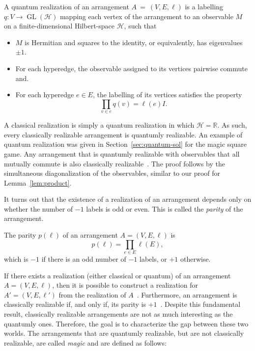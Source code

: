 \documentclass{llncs}
\begin{document}
\begin{definition}\label{def:quantum-re}
  A quantum realization of an arrangement \(A~=~(V, E, \ell)\) is a
  labelling \(q\colon V \to \operatorname{GL}(\mathcal{H})\) mapping
  each vertex of the arrangement to an observable \(M\) on a
  finite-dimensional Hilbert-space \(\mathcal{H}\), such that
  \begin{itemize}
  \item \(M\) is Hermitian and squares to the identity, or
    equivalently, has eigenvalues \(\pm{}1\).
    
  \item For each hyperedge, the observable assigned to its vertices
    pairwise commute and.
    
  \item For each hyperedge \(e \in E\), the labelling of its vertices
    satisfies the property
    \[
      \prod_{v \in e} q(v) = \ell(e) I.
    \]
  \end{itemize}
\end{definition}

A classical realization is simply a quantum realization in which
\(\mathcal{H} = \mathbb{R}\). As such, every classically realizable
arrangement is quantumly realizable. An example of quantum realization
was given in Section~\ref{sec:quantum-sol} for the magic square game.
Any arrangement that is quantumly realizable with observables that all
mutually commute is also classically
realizable~\cite[Proposition 8]{arkhipov:2012}. The proof follows by
the simultaneous diagonalization of the observables, similar to our
proof for Lemma~\ref{lem:product}.

It turns out that the existence of a realization of an arrangement
depends only on whether the number of \(-1\) labels is odd or
even. This is called the \emph{parity} of the arrangement.

\begin{definition}\label{def:parity}
  The parity \(p(\ell)\) of an arrangement \(A = (V, E, \ell)\) is
  \[
    p(\ell) = \prod_{e \in E} \ell(E),
  \]
  which is \(-1\) if there is an odd number of \(-1\) labels, or \(+1\) otherwise.
\end{definition}

If there exists a realization (either classical or quantum) of an
arrangement \(A = (V, E, \ell)\), then it is possible to construct a
realization for \(A' = (V, E, \ell')\) from the realization of
\(A\)~\cite[Propositions 10 and 12]{arkhipov:2012}. Furthermore, an
arrangement is classically realizable if, and only if, its parity is
\(+1\)~\cite[Proposition 11]{arkhipov:2012}. Despite this fundamental result,
classically realizable arrangements are not as much interesting as the
quantumly ones. Therefore, the goal is to characterize the gap between
these two worlds. The arrangements that are quantumly realizable, but
are not classically realizable, are called \emph{magic} and are
defined as follows:
\end{document}
